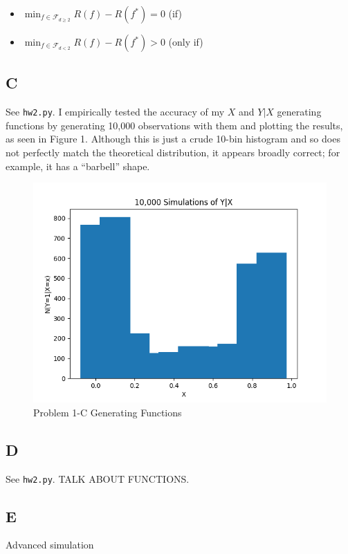 \documentclass{report}
\begin{document}
\begin{itemize}
	\item $\min_{f \in \mathcal{F}_{d \geq 2}} R(f) - R(f^*) = 0$ \qquad (if)
	\item $\min_{f \in \mathcal{F}_{d<2}} R(f) - R(f^*) > 0$ \qquad (only
		if)
\end{itemize}

\newpage

\subsection*{C}

See \texttt{hw2.py}. I empirically tested the accuracy of my $X$ and $Y|X$
generating functions by generating 10,000 observations with them and plotting the results,
as seen in Figure 1. Although this is just a crude 10-bin histogram 
and so does not perfectly match the theoretical distribution, it appears broadly
correct; for example, it has a ``barbell'' shape.

\begin{figure}[h]
	\caption{Problem 1-C Generating Functions}
	\centering
	\includegraphics[scale=0.5]{hist}
\end{figure}

\subsection*{D}

See \texttt{hw2.py}. TALK ABOUT FUNCTIONS.

\subsection*{E}

Advanced simulation
\end{document}
